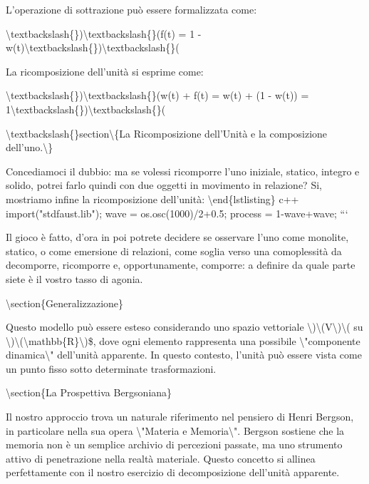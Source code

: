 \documentclass[a4paper,11pt]{article}
\begin{document}
L'operazione di sottrazione pu\`o essere formalizzata come:

\textbackslash{}textbackslash\{\})\textbackslash{}textbackslash\{\}(f(t) = 1 - w(t)\textbackslash{}textbackslash\{\})\textbackslash{}textbackslash\{\}(

La ricomposizione dell'unit\`a si esprime come:

\textbackslash{}textbackslash\{\})\textbackslash{}textbackslash\{\}(w(t) + f(t) = w(t) + (1 - w(t)) = 1\textbackslash{}textbackslash\{\})\textbackslash{}textbackslash\{\}(

\textbackslash{}textbackslash\{\}section\textbackslash{}\{La Ricomposizione dell'Unit\`a e la composizione dell'uno.\textbackslash{}\}

Concediamoci il dubbio: ma se volessi ricomporre l'uno iniziale, statico,
integro e solido, potrei farlo quindi con due oggetti in movimento in
relazione? Si, mostriamo infine la ricomposizione dell'unit\`a:
          \textbackslash{}end\{lstlisting\}
c++
import("stdfaust.lib");
wave = os.osc(1000)/2+0.5;
process = 1-wave+wave;
```

Il gioco \`e fatto, d'ora in poi potrete decidere se osservare l'uno come
monolite, statico, o come emersione di relazioni, come soglia verso
una comoplessit\`a da decomporre, ricomporre e, opportunamente, comporre:
a definire da quale parte siete \`e il vostro tasso di agonia.

\textbackslash{}section\{Generalizzazione\}

Questo modello pu\`o essere esteso considerando uno spazio vettoriale \textbackslash{})\textbackslash{}(V\textbackslash{})\textbackslash{}(
su \textbackslash{})\textbackslash{}(\textbackslash{}mathbb\{R\}\textbackslash{})\$, dove ogni elemento rappresenta una possibile
\textbackslash{}"componente dinamica\textbackslash{}" dell'unit\`a apparente. In questo contesto,
l'unit\`a pu\`o essere vista come un punto fisso sotto determinate
trasformazioni.

\textbackslash{}section\{La Prospettiva Bergsoniana\}

Il nostro approccio trova un naturale riferimento nel pensiero di Henri
Bergson, in particolare nella sua opera \textbackslash{}"Materia e Memoria\textbackslash{}". Bergson
sostiene che la memoria non \`e un semplice archivio di percezioni
passate, ma uno strumento attivo di penetrazione nella realt\`a materiale.
Questo concetto si allinea perfettamente con il nostro esercizio di
decomposizione dell'unit\`a apparente.
\end{document}
